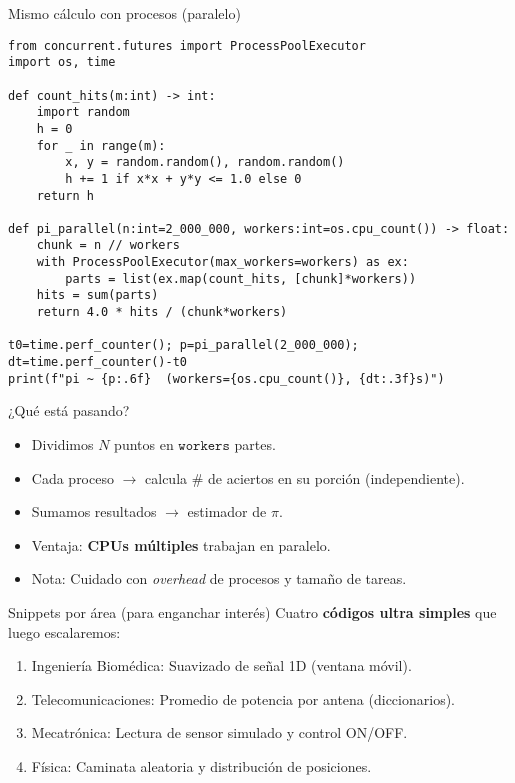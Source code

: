 \documentclass[aspectratio=169,professionalfonts]{beamer}
\begin{document}
\begin{frame}[fragile]{Mismo cálculo con procesos (paralelo)}
\begin{verbatim}
from concurrent.futures import ProcessPoolExecutor
import os, time

def count_hits(m:int) -> int:
    import random
    h = 0
    for _ in range(m):
        x, y = random.random(), random.random()
        h += 1 if x*x + y*y <= 1.0 else 0
    return h

def pi_parallel(n:int=2_000_000, workers:int=os.cpu_count()) -> float:
    chunk = n // workers
    with ProcessPoolExecutor(max_workers=workers) as ex:
        parts = list(ex.map(count_hits, [chunk]*workers))
    hits = sum(parts)
    return 4.0 * hits / (chunk*workers)

t0=time.perf_counter(); p=pi_parallel(2_000_000); dt=time.perf_counter()-t0
print(f"pi ~ {p:.6f}  (workers={os.cpu_count()}, {dt:.3f}s)")
\end{verbatim}
\end{frame}

\begin{frame}{¿Qué está pasando?}
\begin{itemize}
  \item Dividimos \(N\) puntos en \(\texttt{workers}\) partes.
  \item Cada proceso \(\to\) calcula \# de aciertos en su porción (independiente).
  \item Sumamos resultados \(\to\) estimador de \(\pi\).
  \item Ventaja: \textbf{CPUs múltiples} trabajan en paralelo. 
  \item Nota: Cuidado con \textit{overhead} de procesos y tamaño de tareas.
\end{itemize}
\end{frame}

\begin{frame}{Snippets por área (para enganchar interés)}
Cuatro \textbf{códigos ultra simples} que luego escalaremos:
\begin{enumerate}
  \item Ingeniería Biomédica: Suavizado de señal 1D (ventana móvil).
  \item Telecomunicaciones: Promedio de potencia por antena (diccionarios).
  \item Mecatrónica: Lectura de sensor simulado y control ON/OFF.
  \item Física: Caminata aleatoria y distribución de posiciones.
\end{enumerate}
\end{frame}
\end{document}
